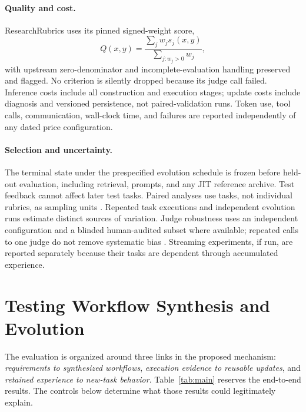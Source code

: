 \documentclass[11pt]{article}
\begin{document}
\paragraph{Quality and cost.}
ResearchRubrics uses its pinned signed-weight score,
\begin{equation}
Q(x,y)=\frac{\sum_jw_js_j(x,y)}{\sum_{j:w_j>0}w_j},
\label{eq:official}
\end{equation}
with upstream zero-denominator and incomplete-evaluation handling preserved and flagged. No criterion is silently dropped because its judge call failed. Inference costs include all construction and execution stages; update costs include diagnosis and versioned persistence, not paired-validation runs. Token use, tool calls, communication, wall-clock time, and failures are reported independently of any dated price configuration.

\paragraph{Selection and uncertainty.}
The terminal state under the prespecified evolution schedule is frozen before held-out evaluation, including retrieval, prompts, and any JIT reference archive. Test feedback cannot affect later test tasks. Paired analyses use tasks, not individual rubrics, as sampling units \citep{dror2018significance}. Repeated task executions and independent evolution runs estimate distinct sources of variation. Judge robustness uses an independent configuration and a blinded human-audited subset where available; repeated calls to one judge do not remove systematic bias \citep{zheng2023judge}. Streaming experiments, if run, are reported separately because their tasks are dependent through accumulated experience.

\section{Testing Workflow Synthesis and Evolution}
\label{sec:results}

The evaluation is organized around three links in the proposed mechanism: \emph{requirements to synthesized workflows}, \emph{execution evidence to reusable updates}, and \emph{retained experience to new-task behavior}. Table~\ref{tab:main} reserves the end-to-end results. The controls below determine what those results could legitimately explain.
\end{document}
